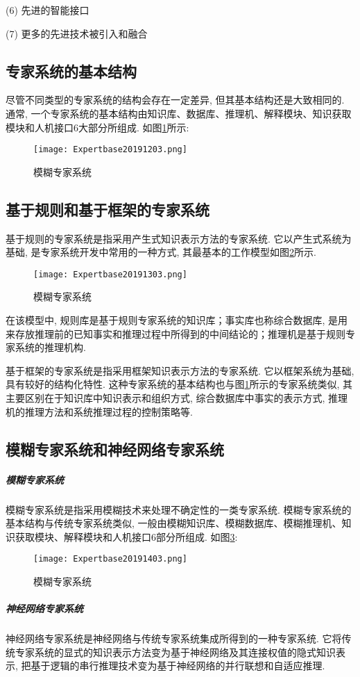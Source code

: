     (6) 先进的智能接口

    (7) 更多的先进技术被引入和融合

\subsection{专家系统的基本结构}
尽管不同类型的专家系统的结构会存在一定差异, 但其基本结构还是大致相同的. 通常, 一个专家系统的基本结构由知识库、数据库、推理机、解释模块、知识获取模块和人机接口6大部分所组成. 如图\ref{Expertbase20191203}所示:
\begin{figure}[H]
\centering
\texttt{[image: Expertbase20191203.png]}
\caption{模糊专家系统}
\label{Expertbase20191203}
\end{figure}
\subsection{基于规则和基于框架的专家系统}
基于规则的专家系统是指采用产生式知识表示方法的专家系统. 它以产生式系统为基础, 是专家系统开发中常用的一种方式, 其最基本的工作模型如图\ref{Expertbase20191303}所示.
\begin{figure}[H]
\centering
\texttt{[image: Expertbase20191303.png]}
\caption{模糊专家系统}
\label{Expertbase20191303}
\end{figure}
在该模型中, 规则库是基于规则专家系统的知识库；事实库也称综合数据库, 是用来存放推理前的已知事实和推理过程中所得到的中间结论的；推理机是基于规则专家系统的推理机构.

基于框架的专家系统是指采用框架知识表示方法的专家系统. 它以框架系统为基础, 具有较好的结构化特性. 这种专家系统的基本结构也与图\ref{Expertbase20191203}所示的专家系统类似, 其主要区别在于知识库中知识表示和组织方式, 综合数据库中事实的表示方式, 推理机的推理方法和系统推理过程的控制策略等.
\subsection{模糊专家系统和神经网络专家系统}
\subparagraph{模糊专家系统}
模糊专家系统是指采用模糊技术来处理不确定性的一类专家系统. 模糊专家系统的基本结构与传统专家系统类似, 一般由模糊知识库、模糊数据库、模糊推理机、知识获取模块、解释模块和人机接口6部分所组成. 如图\ref{Expertbase20191403}:
\begin{figure}[H]
\centering
\texttt{[image: Expertbase20191403.png]}
\caption{模糊专家系统}
\label{Expertbase20191403}
\end{figure}
\subparagraph{神经网络专家系统}
神经网络专家系统是神经网络与传统专家系统集成所得到的一种专家系统. 它将传统专家系统的显式的知识表示方法变为基于神经网络及其连接权值的隐式知识表示, 把基于逻辑的串行推理技术变为基于神经网络的并行联想和自适应推理.
